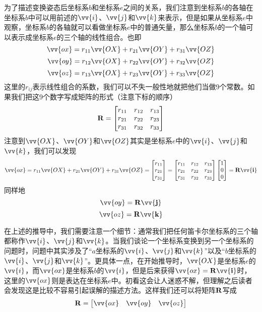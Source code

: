 \documentclass[11pt]{article}
\begin{document}
为了描述变换姿态后坐标系$b$和坐标系$e$之间的关系，我们注意到坐标系$b$的各轴在坐标系$b$中可以用前述的$\vv{i}$、$\vv{j}$和$\vv{k}$来表示，但是如果从坐标系$e$中观察，坐标系$b$的各轴就可以看做坐标系$e$中的普通矢量，那么坐标系$b$的一个轴可以表示成坐标系$e$的三个轴的线性组合。也即
$$
\vv{ox} = r_{11}\vv{OX} + r_{21}\vv{OY} + r_{31}\vv{OZ} 
$$
$$
\vv{oy} = r_{12}\vv{OX} + r_{22}\vv{OY} + r_{32}\vv{OZ} 
$$
$$
\vv{oz} = r_{13}\vv{OX} + r_{23}\vv{OY} + r_{33}\vv{OZ} 
$$
这里的$r_{ij}$表示线性组合的系数，我们可以不失一般性地就把他们当做9个常数。如果我们把这9个数字写成矩阵的形式（注意下标的顺序）
$$
\bf{R} = \begin{bmatrix}
r_{11} & r_{12} & r_{13}\\
r_{21} & r_{22} & r_{23}\\
r_{31} & r_{32} & r_{33}
\end{bmatrix}
$$
注意到$\vv{OX}$、$\vv{OY}$和$\vv{OZ}$其实是坐标系$e$中的$\vv{i}$、$\vv{j}$和$\vv{k}$，我们可以发现
$$
\vv{ox} = r_{11}\vv{OX} + r_{21}\vv{OY} + r_{31}\vv{OZ}  = 
\begin{bmatrix}
r_{11}\\
r_{21}\\
r_{31}
\end{bmatrix} =
\begin{bmatrix}
r_{11} & r_{12} & r_{13}\\
r_{21} & r_{22} & r_{23}\\
r_{31} & r_{32} & r_{33}
\end{bmatrix}
\begin{bmatrix}
1\\
0\\
0
\end{bmatrix} = \bf{R} \vv{i}
$$
同样地
$$
\vv{oy} =   \bf{R} \vv{j}
$$
$$
\vv{oz} =   \bf{R} \vv{k}
$$

在上述的推导中，我们需要注意一个细节：通常我们把任何笛卡尔坐标系的三个轴都称作$\vv{i}$、$\vv{j}$和$\vv{k}$。当我们谈论一个坐标系变换到另一个坐标系的问题时，问题中其实涉及了“$a$坐标系的$\vv{i}$、$\vv{j}$和$\vv{k}$”以及“$b$坐标系的$\vv{i}$、$\vv{j}$和$\vv{k}$”。更具体一点，在开始推导时，$\vv{OX}$是坐标系$e$的$\vv{i}$，而$\vv{ox}$是坐标系$b$的$\vv{i}$，但是后来获得$\vv{ox} =   \bf{R} \vv{i}$时，这里的$\vv{ox}$则是表达在坐标系$e$中。初看这会让人迷惑不解，但理解之后读者会发现这是比较不容易引起误解的描述方法。这样我们还可以将矩阵$\bf{R}$写成
$$
\bf{R} = \begin{bmatrix}
\vv{ox} & \vv{oy} & \vv{oz}\\
\end{bmatrix}
$$
\end{document}
